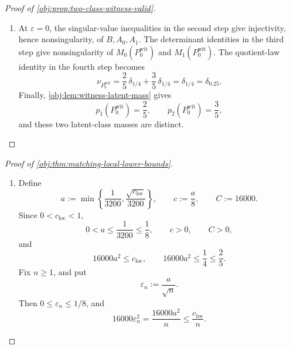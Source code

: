 \begin{proof}[Proof of \cref{obj:prop:two-class-witness-valid}]
\begin{enumerate}
\item At \(\varepsilon=0\), the singular-value inequalities in the second step give injectivity, hence
nonsingularity, of \(B,A_0,A_1\).  The determinant identities in the third step give nonsingularity of
\(M_0(P_0^{\mathrm{wit}})\) and \(M_1(P_0^{\mathrm{wit}})\).  The quotient-law identity in the fourth step becomes
\[
\nu_{P_0^{\mathrm{wit}}}
=
\frac25\,\delta_{1/4}+\frac35\,\delta_{1/4}
=
\delta_{1/4}
=
\delta_{0.25}.
\]
Finally, \cref{obj:lem:witness-latent-mass} gives
\[
p_1(P_0^{\mathrm{wit}})=\frac25,\qquad
p_2(P_0^{\mathrm{wit}})=\frac35,
\]
and these two latent-class masses are distinct. %
\end{enumerate}
\end{proof}

\begin{proof}[Proof of \cref{obj:thm:matching-local-lower-bounds}]
\begin{enumerate}
\item Define
\[
a:=\min\left\{\frac1{3200},\frac{\sqrt{c_{\mathrm{loc}}}}{3200}\right\},
\qquad
c:=\frac a8,
\qquad
C:=16000 .
\]
Since \(0<c_{\mathrm{loc}}<1\),
\[
0<a\le \frac1{3200}\le\frac18,\qquad c>0,\qquad C>0,
\]
and
\[
16000a^2\le c_{\mathrm{loc}},
\qquad
16000a^2\le \frac14\le\frac25 .
\]
Fix \(n\ge1\), and put
\[
\varepsilon_n:=\frac{a}{\sqrt n}.
\]
Then \(0\le\varepsilon_n\le1/8\), and
\[
16000\varepsilon_n^2
=
\frac{16000a^2}{n}
\le
\frac{c_{\mathrm{loc}}}{n}.
\]


\end{enumerate}
\end{proof}
